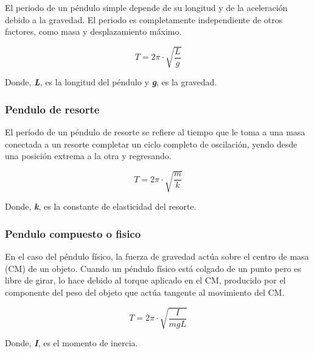 \documentclass[twocolumn, 12pt]{article}
\newcommand{\bolditalic}[1]{\textbf{\textit{#1}}}
\begin{document}
El periodo de un péndulo simple depende de su longitud y de
la aceleración debido a la gravedad. El periodo es
completamente independiente de otros factores, como masa y
desplazamiento máximo.

{\large
\begin{equation}
    T = 2\pi \cdot \sqrt{\frac{L}{g}}
\end{equation}
}

Donde, \bolditalic{L}, es la longitud del péndulo y
\bolditalic{g}, es la gravedad.

\nocite{tipos-pendulos-1}

\subsubsection{Pendulo de resorte}

El período de un péndulo de resorte se refiere al tiempo
que le toma a una masa conectada a un resorte completar un
ciclo completo de oscilación, yendo desde una posición
extrema a la otra y regresando.

    {\large
        \begin{equation}
            T = 2\pi \cdot \sqrt{\frac{m}{k}}
        \end{equation}
    }

Donde, \bolditalic{k}, es la constante de elasticidad del
resorte.

\nocite{tipos-pendulos-2}

\subsubsection{Pendulo compuesto o fisico}

En el caso del péndulo físico, la fuerza de gravedad actúa
sobre el centro de masa (CM) de un objeto. Cuando un
péndulo físico está colgado de un punto pero es libre de
girar, lo hace debido al torque aplicado en el CM,
producido por el componente del peso del objeto que actúa
tangente al movimiento del CM\@.

{\large
\begin{equation}
    T = 2\pi \cdot \sqrt{\frac{I}{m g L}}
    \label{eq:T-pendulo-fisico}
\end{equation}
}

Donde, \bolditalic{I}, es el momento de inercia.

\nocite{tipos-pendulos-1}

\end{document}
